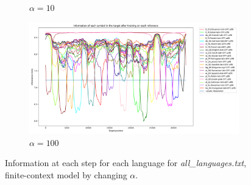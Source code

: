 \documentclass{article}
\begin{document}
\begin{figure}
\begin{subfigure}[b]{0.3\textwidth}
\begin{center}
        \end{center}
        \caption{$\alpha = 10$}
        \label{fig:all_languages_p_c:10:3}
    \end{subfigure}
    \hfill
    \begin{subfigure}[b]{0.3\textwidth}
        \begin{center}
            \includegraphics[width=1.0\linewidth]{../results/all_languages/-p_c:100:3.png}
        \end{center}
        \caption{$\alpha = 100$}
        \label{fig:all_languages_p_c:100:3}
    \end{subfigure}
    
    \caption{Information at each step for each language for \textit{all\_languages.txt}, finite-context model by changing $\alpha$.}
    \label{fig:all_languages_p_c:alpha}
\end{figure}
\end{document}
